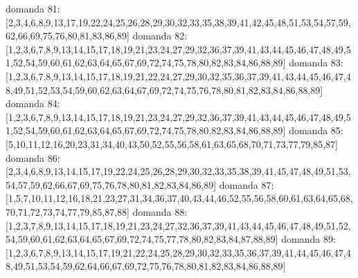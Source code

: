 domanda 81:[2,3,4,6,8,9,13,17,19,22,24,25,26,28,29,30,32,33,35,38,39,41,42,45,48,51,53,54,57,59,62,66,69,75,76,80,81,83,86,89]
domanda 82:[1,2,3,6,7,8,9,13,14,15,17,18,19,21,23,24,27,29,32,36,37,39,41,43,44,45,46,47,48,49,51,52,54,59,60,61,62,63,64,65,67,69,72,74,75,78,80,82,83,84,86,88,89]
domanda 83:[1,2,3,6,7,8,9,13,14,15,17,18,19,21,22,24,27,29,30,32,35,36,37,39,41,43,44,45,46,47,48,49,51,52,53,54,59,60,62,63,64,67,69,72,74,75,76,78,80,81,82,83,84,86,88,89]
domanda 84:[1,2,3,6,7,8,9,13,14,15,17,18,19,21,23,24,27,29,32,36,37,39,41,43,44,45,46,47,48,49,51,52,54,59,60,61,62,63,64,65,67,69,72,74,75,78,80,82,83,84,86,88,89]
domanda 85:[5,10,11,12,16,20,23,31,34,40,43,50,52,55,56,58,61,63,65,68,70,71,73,77,79,85,87]
domanda 86:[2,3,4,6,8,9,13,14,15,17,19,22,24,25,26,28,29,30,32,33,35,38,39,41,45,47,48,49,51,53,54,57,59,62,66,67,69,75,76,78,80,81,82,83,84,86,89]
domanda 87:[1,5,7,10,11,12,16,18,21,23,27,31,34,36,37,40,43,44,46,52,55,56,58,60,61,63,64,65,68,70,71,72,73,74,77,79,85,87,88]
domanda 88:[1,2,3,7,8,9,13,14,15,17,18,19,21,23,24,27,32,36,37,39,41,43,44,45,46,47,48,49,51,52,54,59,60,61,62,63,64,65,67,69,72,74,75,77,78,80,82,83,84,87,88,89]
domanda 89:[1,2,3,6,7,8,9,13,14,15,17,19,21,22,24,25,28,29,30,32,33,35,36,37,39,41,44,45,46,47,48,49,51,53,54,59,62,64,66,67,69,72,75,76,78,80,81,82,83,84,86,88,89]


